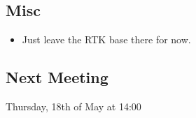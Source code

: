 \subsection{Misc}
\begin{itemize}
    \item Just leave the RTK base there for now.
\end{itemize}

\subsection{Next Meeting}
Thursday, 18th of May at 14:00
